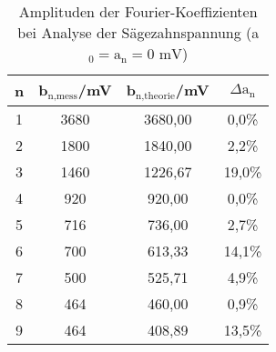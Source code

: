 \begin{table}[h]
	\begin{center}
		\begin{tabular}{cccc}
			n&b$_\text{n,mess}$/mV & b$_\text{n,theorie}$/mV & $\Delta \text{a}_\text{n}$\\ \hline
			1&3680&3680,00&0,0\%\\
			2&1800&1840,00&2,2\%\\
			3&1460&1226,67&19,0\%\\
			4&920&920,00&0,0\%\\
			5&716&736,00&2,7\%\\
			6&700&613,33&14,1\%\\
			7&500&525,71&4,9\%\\
			8&464&460,00&0,9\%\\
			9&464&408,89&13,5\%
		\end{tabular}
		\caption{Amplituden der Fourier-Koeffizienten bei Analyse der Sägezahnspannung (a$_\text{0}=\text{a}_\text{n}=0\text{ mV}$)}
		\label{tabfas}
	\end{center}
\end{table}